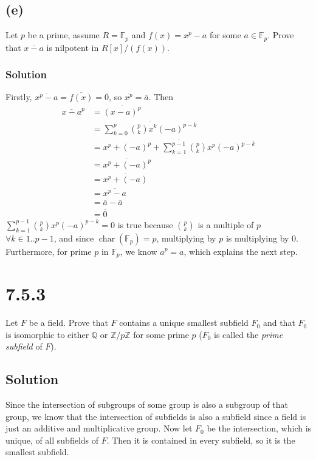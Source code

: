 \documentclass[fleqn]{article}
\DeclareMathOperator{\Char}{char}
\begin{document}
        \subsection{(e)}
        Let $p$ be a prime, assume $R = \mathbb{F}_p$ and $f(x) = x^p - a$ for some $a \in \mathbb{F}_p$.  Prove that $\overline{x - a}$ is nilpotent in $R[x]/(f(x))$.
            
            \subsubsection{Solution}
            Firstly, $\overline{x^p - a} = \overline{f(x)} = \overline{0}$, so $\overline{x^p} = \overline{a}$.  Then
            \begin{align}
                \overline{x - a}^p &= \overline{(x - a)^p} \\
                    &= \overline{\sum\limits_{k = 0}^{p} \binom{p}{k} x^k (-a)^{p - k}} \\
                    &= \overline{x^p + (-a)^p + \sum\limits_{k = 1}^{p - 1} \binom{p}{k} x^p (-a)^{p - k}} \\
                    &= \overline{x^p + (-a)^p} \\
                    &= \overline{x^p + (-a)} \\
                    &= \overline{x^p - a} \\
                    &= \overline{a} - \overline{a} \\
                    &= \overline{0}
            \end{align}
            $\sum\limits_{k = 1}^{p - 1} \binom{p}{k} x^p (-a)^{p - k} = 0$ is true because $\binom{p}{k}$ is a multiple of $p$ $\forall k \in 1..p - 1$, and since $\Char(\mathbb{F}_p) = p$, multiplying by $p$ is multiplying by 0.  Furthermore, for prime $p$ in $\mathbb{F}_p$, we know $a^p = a$, which explains the next step.
    
    \section{7.5.3}
    Let $F$ be a field.  Prove that $F$ contains a unique smallest subfield $F_0$ and that $F_0$ is isomorphic to either $\mathbb{Q}$ or $\mathbb{Z}/p\mathbb{Z}$ for some prime $p$ ($F_0$ is called the \textit{prime subfield} of $F$).
        
        \subsection{Solution}
        Since the intersection of subgroups of some group is also a subgroup of that group, we know that the intersection of subfields is also a subfield since a field is just an additive and multiplicative group.  Now let $F_0$ be the intersection, which is unique, of all subfields of $F$.  Then it is contained in every subfield, so it is the smallest subfield.
        
\end{document}
